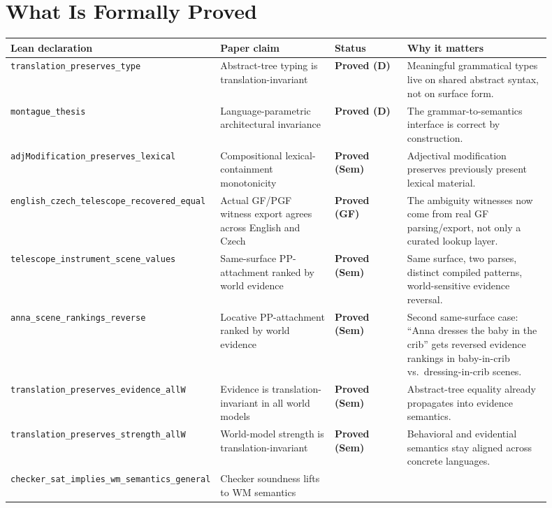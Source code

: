 \documentclass[11pt]{article}
\newcommand{\code}[1]{\texttt{#1}}
\begin{document}
\section*{What Is Formally Proved}
\begin{center}
\small
\begin{tabular}{@{}p{0.26\linewidth}p{0.22\linewidth}p{0.14\linewidth}p{0.28\linewidth}@{}}
\toprule
\textbf{Lean declaration} & \textbf{Paper claim} & \textbf{Status} & \textbf{Why it matters} \\
\midrule
\code{translation\_preserves\_type} &
Abstract-tree typing is translation-invariant &
\textbf{Proved (D)} &
Meaningful grammatical types live on shared abstract syntax, not on surface form. \\
\code{montague\_thesis} &
Language-parametric architectural invariance &
\textbf{Proved (D)} &
The grammar-to-semantics interface is correct by construction. \\
\code{adjModification\_preserves\_lexical} &
Compositional lexical-containment monotonicity &
\textbf{Proved (Sem)} &
Adjectival modification preserves previously present lexical material. \\
\code{english\_czech\_telescope\_recovered\_equal} &
Actual GF/PGF witness export agrees across English and Czech &
\textbf{Proved (GF)} &
The ambiguity witnesses now come from real GF parsing/export, not only a curated lookup layer. \\
\code{telescope\_instrument\_scene\_values} &
Same-surface PP-attachment ranked by world evidence &
\textbf{Proved (Sem)} &
Same surface, two parses, distinct compiled patterns, world-sensitive evidence reversal. \\
\code{anna\_scene\_rankings\_reverse} &
Locative PP-attachment ranked by world evidence &
\textbf{Proved (Sem)} &
Second same-surface case: ``Anna dresses the baby in the crib'' gets reversed
evidence rankings in baby-in-crib vs.\ dressing-in-crib scenes. \\
\code{translation\_preserves\_evidence\_allW} &
Evidence is translation-invariant in all world models &
\textbf{Proved (Sem)} &
Abstract-tree equality already propagates into evidence semantics. \\
\code{translation\_preserves\_strength\_allW} &
World-model strength is translation-invariant &
\textbf{Proved (Sem)} &
Behavioral and evidential semantics stay aligned across concrete languages. \\
\code{checker\_sat\_implies\_wm\_semantics\_general} &
Checker soundness lifts to WM semantics &

\end{tabular}
\end{center}
\end{document}
